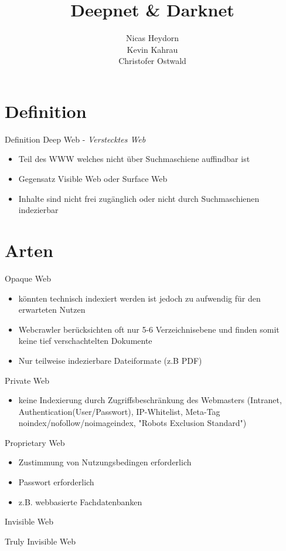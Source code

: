 \documentclass[12pt]{beamer}
\author{Nicas Heydorn \\ Kevin Kahrau \\ Christofer Ostwald}
\title{Deepnet \& Darknet}
\institute{Nordakademie - Hochschule der Wirtschaft}
\begin{document}
\begin{frame}
\titlepage
\end{frame}

\begin{frame}
\tableofcontents
\end{frame}

\section{Definition}
\begin{frame}{Definition}
	Deep Web - \emph{Verstecktes Web}
	\begin{itemize}
		\item Teil des WWW welches nicht über Suchmaschiene auffindbar ist
		\item Gegensatz Visible Web oder Surface Web
\item Inhalte sind nicht frei zugänglich oder nicht durch Suchmaschienen indezierbar
	\end{itemize}
\end{frame}

\section{Arten}
\begin{frame}{Opaque Web}
	\begin{itemize}
		\item könnten technisch indexiert werden ist jedoch zu aufwendig für den erwarteten Nutzen
		\item Webcrawler berücksichten oft nur 5-6 Verzeichnisebene und finden somit keine tief verschachtelten Dokumente
		\item Nur teilweise indezierbare Dateiformate (z.B PDF)
	\end{itemize}
\end{frame}
\begin{frame}{Private Web}
	\begin{itemize}
		\item keine Indexierung durch Zugriffsbeschränkung des Webmasters (Intranet, Authentication(User/Passwort), IP-Whitelist, Meta-Tag noindex/nofollow/noimageindex, "Robots Exclusion Standard")
	\end{itemize}
\end{frame}
\begin{frame}{Proprietary Web}
	\begin{itemize}
		\item Zustimmung von Nutzungsbedingen erforderlich
		\item Passwort erforderlich
		\item z.B. webbasierte Fachdatenbanken
	\end{itemize}
\end{frame}
\begin{frame}{Invisible Web}
	
\end{frame}
\begin{frame}{Truly Invisible Web}
\end{frame}
\end{document}
